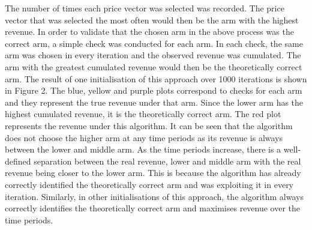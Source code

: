 \documentclass[a4paper]{article}
\begin{document}
The number of times each price vector was selected was recorded. The price vector that was selected the most often would then be the arm with the highest revenue.
\newline
\newline
In order to validate that the chosen arm in the above process was the correct arm, a simple check was conducted for each arm. In each check, the same arm was chosen in every iteration and the observed revenue was cumulated. The arm with the greatest cumulated revenue would then be the theoretically correct arm. The result of one initialisation of this approach over 1000 iterations is shown in Figure 2.
\newline
\newline
The blue, yellow and purple plots correspond to checks for each arm and they represent the true revenue under that arm. Since the lower arm has the highest cumulated revenue, it is the theoretically correct arm. The red plot represents the revenue under this algorithm. It can be seen that the algorithm does not choose the higher arm at any time periods as its revenue is always between the lower and middle arm. As the time periods increase, there is a well-defined separation between the real revenue, lower and middle arm with the real revenue being closer to the lower arm. This is because the algorithm has already correctly identified the theoretically correct arm and was exploiting it in every iteration. 
\newline
\newline
Similarly, in other initialisations of this approach, the algorithm always correctly identifies the theoretically correct arm and maximises revenue over the time periods.
\end{document}
